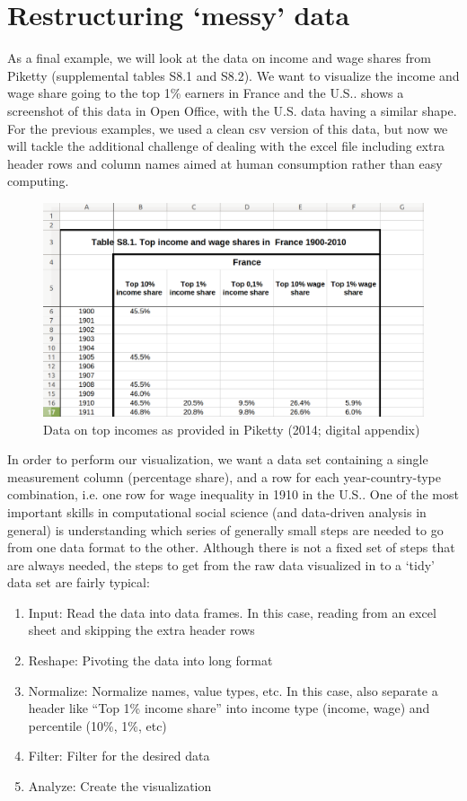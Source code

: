 \section{Restructuring `messy' data}

As a final example, we will look at the data on income and wage shares from Piketty (supplemental tables S8.1 and S8.2).
We want to visualize the income and wage share going to the top 1\% earners in France and the U.S..
 shows a screenshot of this data in Open Office, with the U.S. data having a similar shape.
For the previous examples, we used a clean csv version of this data, but now we will tackle the additional challenge
of dealing with the excel file including extra header rows and column names aimed at human consumption rather than easy computing. 

\begin{figure}
  \includegraphics[width=\linewidth]{ch_data_wrangling/messy.png}
  \caption{Data on top incomes as provided in Piketty (2014; digital appendix)}\label{fig:messy}
\end{figure}

In order to perform our visualization, we want a data set containing a single measurement column (percentage share),
and a row for each year-country-type combination, i.e. one row for wage inequality in 1910 in the U.S..
One of the most important skills in computational social science (and data-driven analysis in general) is
understanding which series of generally small steps are needed to go from one data format to the other.
Although there is not a fixed set of steps that are always needed, the steps to get from the raw data visualized in  to a `tidy' data set are fairly typical:

\begin{enumerate}
  \item Input: Read the data into data frames. In this case, reading from an excel sheet and skipping the extra header rows
  \item Reshape: Pivoting the data into long format
  \item Normalize: Normalize names, value types, etc. In this case, also separate a header like ``Top 1\% income share'' into income type (income, wage) and percentile (10\%, 1\%, etc)
  \item Filter: Filter for the desired data
  \item Analyze: Create the visualization
\end{enumerate}

